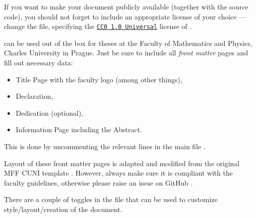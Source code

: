 \begin{remark}[License]
    If you want to make your document publicly available (together with the source code), you should not forget to include an appropriate license of your choice --- change the  file, specifying the \href{https://creativecommons.org/publicdomain/zero/1.0/}{\texttt{CC0 1.0 Universal}} license of \TeXtured{}.
\end{remark}
\begin{remark}
    \TeXtured{} can be used out of the box for theses at the Faculty of Mathematics and Physics, Charles University in Prague.
    Just be sure to include all \emph{front matter} pages and fill out necessary data:
    \begin{itemize}
        \item \textsf{Title Page} with the faculty logo (among other things),
        \item \textsf{Declaration},
        \item \textsf{Dedication} (optional),
        \item \textsf{Information Page} including the \textsf{Abstract}.
    \end{itemize}
    This is done by uncommenting the relevant lines in the main file .

    Layout of these front matter pages is adapted and modified from the original MFF CUNI template \autocite{MaresTemplate}.
    However, always make sure it is compliant with the faculty guidelines, otherwise please raise an issue on \textsf{GitHub} \autocite{TeXtured}.
\end{remark}

\begin{remark}
    There are a couple of toggles in the  file that can be used to customize style/layout/creation of the document.
\end{remark}
